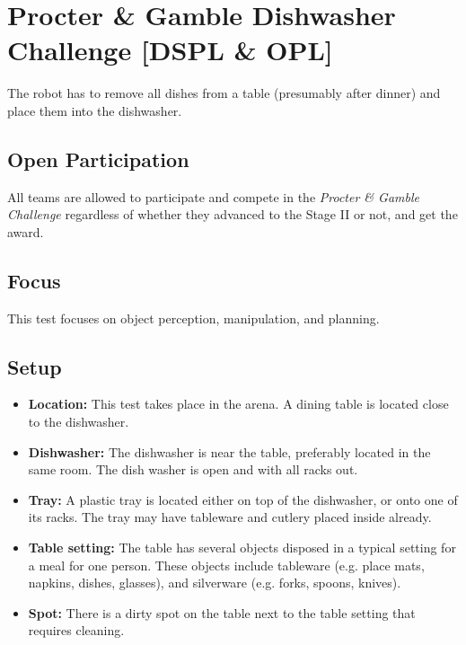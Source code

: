 \section{Procter \& Gamble Dishwasher Challenge [DSPL \& OPL]}

\newcommand{\openpart}{%
All teams are allowed to participate and compete in the \textit{Procter \& Gamble Challenge} regardless of whether they advanced to the Stage II or not, and get the award.
}

The robot has to remove all dishes from a table (presumably after dinner) and place them into the dishwasher.

\subsection{Open Participation}
\openpart

\subsection{Focus}
This test focuses on object perception, manipulation, and planning.

\subsection{Setup}
\begin{itemize}
	\item \textbf{Location:} This test takes place in the arena. A dining table is located close to the dishwasher.
	\item \textbf{Dishwasher:} The dishwasher is near the table, preferably located in the same room. The dish washer is open and with all racks out.
	\item \textbf{Tray:} A plastic tray is located either on top of the dishwasher, or onto one of its racks. The tray may have tableware and cutlery placed inside already.
	\item \textbf{Table setting:} The table has several objects disposed in a typical setting for a meal for one person. These objects include tableware (e.g. place mats, napkins, dishes, glasses), and silverware (e.g. forks, spoons, knives).
	\item \textbf{Spot:} There is a dirty spot on the table next to the table setting that requires cleaning.
\end{itemize}


